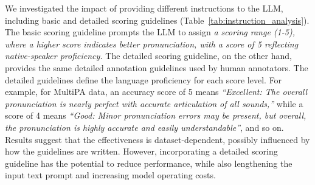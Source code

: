 \documentclass[11pt]{article}
\begin{document}
We investigated the impact of providing different instructions to the LLM, including basic and detailed scoring guidelines (Table~\ref{tab:instruction_analysis}). The basic scoring guideline prompts the LLM to assign \textit{a scoring range (1-5), where a higher score indicates better pronunciation, with a score of 5 reflecting native-speaker proficiency.} The detailed scoring guideline, on the other hand, provides the same detailed annotation guidelines used by human annotators. The detailed guidelines define the language proficiency for each score level. For example, for MultiPA data, an accuracy score of 5 means \textit{“Excellent: The overall pronunciation is nearly perfect with accurate articulation of all sounds,”} while a score of 4 means \textit{“Good: Minor pronunciation errors may be present, but overall, the pronunciation is highly accurate and easily understandable”}, and so on. Results suggest that the effectiveness is dataset-dependent, possibly influenced by how the guidelines are written. However, incorporating a detailed scoring guideline has the potential to reduce performance, while also lengthening the input text prompt and increasing model operating costs.
\end{document}
